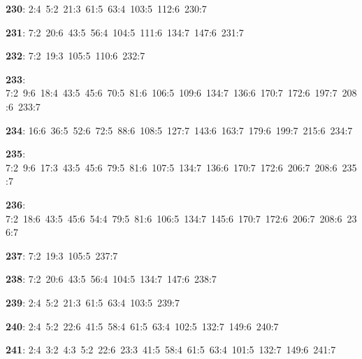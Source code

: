 \noindent \textbf{230}: 2:4\allowbreak\ 5:2\allowbreak\ 21:3\allowbreak\ 61:5\allowbreak\ 63:4\allowbreak\ 103:5\allowbreak\ 112:6\allowbreak\ 230:7\par
\noindent \textbf{231}: 7:2\allowbreak\ 20:6\allowbreak\ 43:5\allowbreak\ 56:4\allowbreak\ 104:5\allowbreak\ 111:6\allowbreak\ 134:7\allowbreak\ 147:6\allowbreak\ 231:7\par
\noindent \textbf{232}: 7:2\allowbreak\ 19:3\allowbreak\ 105:5\allowbreak\ 110:6\allowbreak\ 232:7\par
\noindent \textbf{233}: 7:2\allowbreak\ 9:6\allowbreak\ 18:4\allowbreak\ 43:5\allowbreak\ 45:6\allowbreak\ 70:5\allowbreak\ 81:6\allowbreak\ 106:5\allowbreak\ 109:6\allowbreak\ 134:7\allowbreak\ 136:6\allowbreak\ 170:7\allowbreak\ 172:6\allowbreak\ 197:7\allowbreak\ 208:6\allowbreak\ 233:7\par
\noindent \textbf{234}: 16:6\allowbreak\ 36:5\allowbreak\ 52:6\allowbreak\ 72:5\allowbreak\ 88:6\allowbreak\ 108:5\allowbreak\ 127:7\allowbreak\ 143:6\allowbreak\ 163:7\allowbreak\ 179:6\allowbreak\ 199:7\allowbreak\ 215:6\allowbreak\ 234:7\par
\noindent \textbf{235}: 7:2\allowbreak\ 9:6\allowbreak\ 17:3\allowbreak\ 43:5\allowbreak\ 45:6\allowbreak\ 79:5\allowbreak\ 81:6\allowbreak\ 107:5\allowbreak\ 134:7\allowbreak\ 136:6\allowbreak\ 170:7\allowbreak\ 172:6\allowbreak\ 206:7\allowbreak\ 208:6\allowbreak\ 235:7\par
\noindent \textbf{236}: 7:2\allowbreak\ 18:6\allowbreak\ 43:5\allowbreak\ 45:6\allowbreak\ 54:4\allowbreak\ 79:5\allowbreak\ 81:6\allowbreak\ 106:5\allowbreak\ 134:7\allowbreak\ 145:6\allowbreak\ 170:7\allowbreak\ 172:6\allowbreak\ 206:7\allowbreak\ 208:6\allowbreak\ 236:7\par
\noindent \textbf{237}: 7:2\allowbreak\ 19:3\allowbreak\ 105:5\allowbreak\ 237:7\par
\noindent \textbf{238}: 7:2\allowbreak\ 20:6\allowbreak\ 43:5\allowbreak\ 56:4\allowbreak\ 104:5\allowbreak\ 134:7\allowbreak\ 147:6\allowbreak\ 238:7\par
\noindent \textbf{239}: 2:4\allowbreak\ 5:2\allowbreak\ 21:3\allowbreak\ 61:5\allowbreak\ 63:4\allowbreak\ 103:5\allowbreak\ 239:7\par
\noindent \textbf{240}: 2:4\allowbreak\ 5:2\allowbreak\ 22:6\allowbreak\ 41:5\allowbreak\ 58:4\allowbreak\ 61:5\allowbreak\ 63:4\allowbreak\ 102:5\allowbreak\ 132:7\allowbreak\ 149:6\allowbreak\ 240:7\par
\noindent \textbf{241}: 2:4\allowbreak\ 3:2\allowbreak\ 4:3\allowbreak\ 5:2\allowbreak\ 22:6\allowbreak\ 23:3\allowbreak\ 41:5\allowbreak\ 58:4\allowbreak\ 61:5\allowbreak\ 63:4\allowbreak\ 101:5\allowbreak\ 132:7\allowbreak\ 149:6\allowbreak\ 241:7\par
